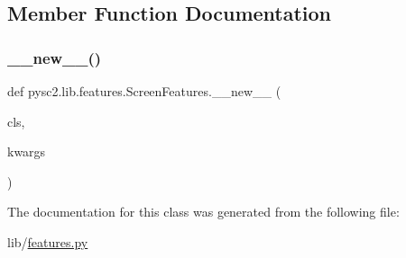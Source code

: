 \subsection{Member Function Documentation}
\mbox{\label{classpysc2_1_1lib_1_1features_1_1_screen_features_a30f47c7db2836974eb515784b1efe33b}} 
\subsubsection{\texorpdfstring{\+\_\+\+\_\+new\+\_\+\+\_\+()}{\_\_new\_\_()}}
{\footnotesize\ttfamily def pysc2.\+lib.\+features.\+Screen\+Features.\+\_\+\+\_\+new\+\_\+\+\_\+ (\begin{DoxyParamCaption}\item[{}]{cls,  }\item[{}]{kwargs }\end{DoxyParamCaption})}



The documentation for this class was generated from the following file\+:\begin{DoxyCompactItemize}
\item 
lib/\mbox{\hyperlink{features_8py}{features.\+py}}\end{DoxyCompactItemize}
